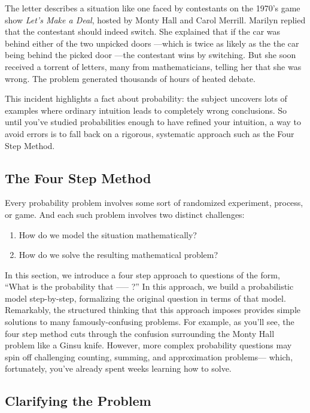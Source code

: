 The letter describes a situation like one faced by contestants on the
1970's game show \textit{Let's Make a Deal}, hosted by Monty Hall and
Carol Merrill.  Marilyn replied that the contestant should indeed switch.
She explained that if the car was behind either of the two unpicked doors
---which is twice as likely as the the car being behind the picked door
---the contestant wins by switching.  But she soon received a torrent of
letters, many from mathematicians, telling her that she was wrong.  The
problem generated thousands of hours of heated debate.

This incident highlights a fact about probability: the subject uncovers
lots of examples where ordinary intuition leads to completely wrong
conclusions.  So until you've studied probabilities enough to have
refined your intuition, a way to avoid errors is to fall back on a
rigorous, systematic approach such as the Four Step Method.

\subsection{The Four Step Method}

Every probability problem involves some sort of randomized experiment,
process, or game.  And each such problem involves two distinct
challenges:
%
\begin{enumerate}
\item How do we model the situation mathematically?
\item How do we solve the resulting mathematical problem?
\end{enumerate}
%
In this section, we introduce a four step approach to questions of the
form, ``What is the probability that ----- ?''  In this approach, we build
a probabilistic model step-by-step, formalizing the original question in
terms of that model.  Remarkably, the structured thinking that this
approach imposes provides simple solutions to many famously-confusing
problems.  For example, as you'll see, the four step method cuts through
the confusion surrounding the Monty Hall problem like a Ginsu knife.
However, more complex probability questions may spin off challenging
counting, summing, and approximation problems--- which, fortunately,
you've already spent weeks learning how to solve.

\subsection{Clarifying the Problem}

